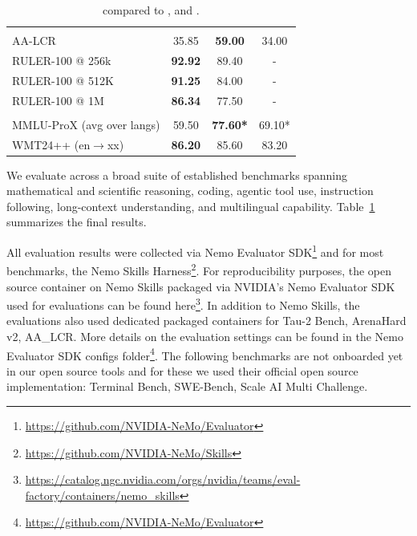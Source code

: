 \begin{table}[!htp]
\begin{tabular}{l|c c c }
\midrule
\rowcolor{black!5}
\multicolumn{4}{l}{\textbf{Long Context}} \\
AA-LCR & 35.85 & \textbf{59.00} & 34.00 \\
RULER-100 @ 256k & \textbf{92.92} & 89.40 & - \\
RULER-100 @ 512K & \textbf{91.25} & 84.00 & - \\
RULER-100 @ 1M & \textbf{86.34} & 77.50 & - \\

\midrule
\rowcolor{black!5}
\multicolumn{4}{l}{\textbf{Multilingual}} \\
MMLU-ProX (avg over langs) & 59.50 & \textbf{77.60*} & 69.10* \\
WMT24++ (en$\rightarrow$xx) & \textbf{86.20} & 85.60 & 83.20 \\

\bottomrule
\end{tabular}

\caption{
\ourmodel compared to , and . 
}
\label{tab:nano_v3_comparison}
\end{table}


We evaluate \ourmodel across a broad suite of established benchmarks spanning mathematical and
scientific reasoning, coding, agentic tool use, instruction following, long-context understanding, and
multilingual capability. Table~\ref{tab:nano_v3_comparison} summarizes the final results.

All evaluation results were collected via Nemo Evaluator SDK\footnote{\url{https://github.com/NVIDIA-NeMo/Evaluator}} and for most benchmarks, the Nemo Skills Harness\footnote{\url{https://github.com/NVIDIA-NeMo/Skills}}. For reproducibility purposes, the open source container on Nemo Skills packaged via NVIDIA's Nemo Evaluator SDK used for evaluations can be found here\footnote{\url{https://catalog.ngc.nvidia.com/orgs/nvidia/teams/eval-factory/containers/nemo_skills}}. In addition to Nemo Skills, the evaluations also used dedicated packaged containers for Tau-2 Bench, ArenaHard v2, AA\_LCR. More details on the evaluation settings can be found in the Nemo Evaluator SDK configs folder\footnote{\url{https://github.com/NVIDIA-NeMo/Evaluator}}. The following benchmarks are not onboarded yet in our open source tools and for these we used their official open source implementation: Terminal Bench, SWE-Bench, Scale AI Multi Challenge.


